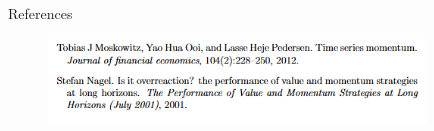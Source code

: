 \documentclass{beamer}
\begin{document}
\begin{frame}[t]{References}
    \begin{figure}[t!]\centering
    \includegraphics[width=10cm]{figures/ref2.PNG}
    \centering
    \label{ref2}
    \end{figure}
    
\end{frame}
\end{document}
